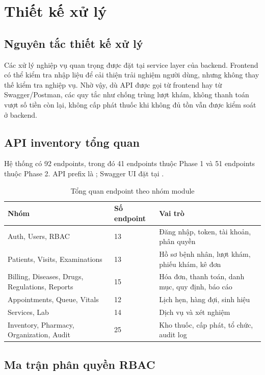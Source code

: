 \section{Thiết kế xử lý}

\subsection{Nguyên tắc thiết kế xử lý}

Các xử lý nghiệp vụ quan trọng được đặt tại service layer của backend. Frontend có thể kiểm tra nhập liệu để cải thiện trải nghiệm người dùng, nhưng không thay thế kiểm tra nghiệp vụ. Nhờ vậy, dù API được gọi từ frontend hay từ Swagger/Postman, các quy tắc như chống trùng lượt khám, không thanh toán vượt số tiền còn lại, không cấp phát thuốc khi không đủ tồn vẫn được kiểm soát ở backend.

\subsection{API inventory tổng quan}

Hệ thống có 92 endpoints, trong đó 41 endpoints thuộc Phase 1 và 51 endpoints thuộc Phase 2. API prefix là ; Swagger UI đặt tại .

\begin{table}[H]
\centering
\caption{Tổng quan endpoint theo nhóm module}
\begin{tabularx}{\textwidth}{|p{4.2cm}|p{2.5cm}|X|}
\hline
\textbf{Nhóm} & \textbf{Số endpoint} & \textbf{Vai trò} \\
\hline
Auth, Users, RBAC & 13 & Đăng nhập, token, tài khoản, phân quyền \\
\hline
Patients, Visits, Examinations & 13 & Hồ sơ bệnh nhân, lượt khám, phiếu khám, kê đơn \\
\hline
Billing, Diseases, Drugs, Regulations, Reports & 15 & Hóa đơn, thanh toán, danh mục, quy định, báo cáo \\
\hline
Appointments, Queue, Vitals & 12 & Lịch hẹn, hàng đợi, sinh hiệu \\
\hline
Services, Lab & 14 & Dịch vụ và xét nghiệm \\
\hline
Inventory, Pharmacy, Organization, Audit & 25 & Kho thuốc, cấp phát, tổ chức, audit log \\
\hline
\end{tabularx}
\end{table}

\subsection{Ma trận phân quyền RBAC}

